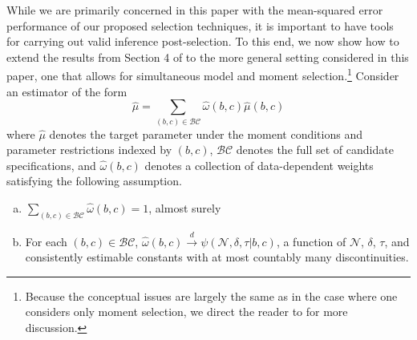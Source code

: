 While we are primarily concerned in this paper with the mean-squared error performance of our proposed selection techniques, it is important to have tools for carrying out valid inference post-selection.
To this end, we now show how to extend the results from Section 4 of \cite{DiTraglia2012} to the more general setting considered in this paper, one that allows for simultaneous model and moment selection.\footnote{Because the conceptual issues are largely the same as in the case where one considers only moment selection, we direct the reader to \cite{DiTraglia2012} for more discussion.}
Consider an estimator of the form 
	$$\widehat{\mu} = \sum_{(b,c) \in \mathcal{BC}} \widehat{\omega}(b,c) \widehat{\mu}(b,c)$$
  where $\widehat{\mu}$ denotes the target parameter under the moment conditions and parameter restrictions indexed by $(b,c)$, $\mathcal{BC}$ denotes the full set of candidate specifications, and $\widehat{\omega}(b,c)$ denotes a collection of data-dependent weights satisfying the following assumption.
\begin{assump}\mbox{}
	\begin{enumerate}[(a)] 
		\item $\sum_{(b,c) \in \mathcal{BC}} \widehat{\omega}(b,c) = 1$, almost surely
    \item For each $(b,c) \in \mathcal{BC}$, $\widehat{\omega}(b,c) \overset{d}{\rightarrow} \psi(\mathscr{N}, \delta, \tau|b,c)$,  a function of $\mathscr{N}$, $\delta$, $\tau$, and consistently estimable constants with at most countably many discontinuities.
	\end{enumerate}
\label{assump:weight}
\end{assump}


